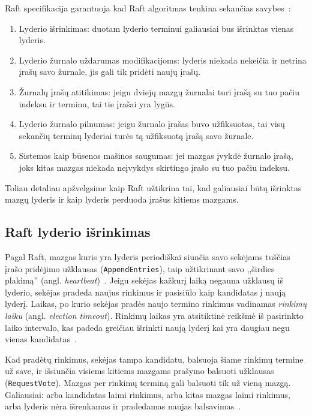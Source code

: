 \documentclass{VUMIFPSkursinis}
\begin{document}
Raft specifikacija garantuoja kad Raft algoritmas tenkina sekančias savybes~\cite{ongaro_consensus}: 

\begin{enumerate}
\item Lyderio išrinkimas: duotam lyderio terminui galiausiai bus išrinktas vienas lyderis.
\item Lyderio žurnalo uždarumas modifikacijoms: lyderis niekada nekeičia ir netrina įrašų savo žurnale, jis gali tik pridėti naujų įrašų.
\item Žurnalų įrašų atitikimas: jeigu dviejų mazgų žurnalai turi įrašą su tuo pačiu indeksu ir terminu, tai tie įrašai yra lygūs.
\item Lyderio žurnalo pilnumas: jeigu žurnalo įrašas buvo užfiksuotas, tai visų sekančių terminų lyderiai turės tą užfiksuotą įrašą savo žurnale.
\item Sistemos kaip būsenos mašinos saugumas: jei mazgas įvykdė žurnalo įrašą, joks kitas mazgas niekada neįvykdys skirtingo įrašo su tuo pačiu indeksu.
\end{enumerate}

Toliau detaliau apžvelgsime kaip Raft užtikrina tai, kad galiausiai būtų išrinktas mazgų lyderis ir kaip lyderis perduoda įrašus kitiems mazgams.

\subsection{Raft lyderio išrinkimas}

Pagal Raft, mazgas kuris yra lyderis periodiškai siunčia savo sekėjams tuščias įrašo pridėjimo užklausas (\texttt{AppendEntries}), taip užtikrinant savo ,,širdies plakimą'' (angl. \textit{heartbeat})~\cite{ongaro_consensus}. Jeigu sekėjas kažkurį laiką negauna užklausų iš lyderio, sekėjas pradeda naujus rinkimus ir pasisiūlo kaip kandidatas į naują lyderį. Laikas, po kurio sekėjas pradės naujo termino rinkimus vadinamas \textit{rinkimų laiku} (angl. \textit{election timeout}). Rinkimų laikas yra atsitiktinė reikšmė iš pasirinkto laiko intervalo, kas padeda greičiau išrinkti naują lyderį kai yra daugiau negu vienas kandidatas~\cite{ongaro_consensus}.

Kad pradėtų rinkimus, sekėjas tampa kandidatu, balsuoja šiame rinkimų termine už save, ir išsiunčia visiems kitiems mazgams prašymo balsuoti užklausas (\texttt{RequestVote}). Mazgas per rinkimų terminą gali balsuoti tik už vieną mazgą. Galiausiai: arba kandidatas laimi rinkimus, arba kitas mazgas laimi rinkimus, arba lyderis nėra išrenkamas ir pradedamas naujas balsavimas~\cite{ongaro_consensus}.
\end{document}
